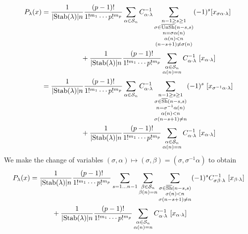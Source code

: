 \documentclass[12pt]{article}
\begin{document}
\begin{align}
P_{\lambda}(x)&= \frac{1}{|{\rm Stab}(\lambda)|n}\frac{(p-1)!}{1!^{m_1}\cdots  p!^{m_p}}\sum_{\alpha \in \mathcal{S}_n} C^{-1}_{\alpha \cdot \lambda }\sum_{\substack{n-1 \geq s\geq 1\\  
 \sigma\in\overline{\rm UnSh}(n-s,s)\\ n=\sigma \alpha(n) \\ \alpha(n)<n \\ (n-s+1)\neq \sigma(n)}} (-1)^{s}[x_{\sigma\alpha\cdot \lambda}] \\
 &\hspace{2cm} + \frac{1}{|{\rm Stab}(\lambda)|n}\frac{(p-1)!}{1!^{m_1}\cdots  p!^{m_p}} \sum_{\substack{\alpha \in \mathcal{S}_n \\ \alpha(n)=n}} C^{-1}_{\alpha\cdot\lambda} \,\,[x_{\alpha\cdot\lambda}]\\
 &= \frac{1}{|{\rm Stab}(\lambda)|n}\frac{(p-1)!}{1!^{m_1}\cdots  p!^{m_p}}\sum_{\alpha \in \mathcal{S}_n} C^{-1}_{\alpha \cdot \lambda }\sum_{\substack{n-1 \geq s\geq 1\\  
 \sigma\in\overline{\rm Sh}(n-s,s)\\ n=\sigma^{-1} \alpha(n)  \\ \alpha(n)<n \\ \sigma(n-s+1)\neq n}} (-1)^{s}\,\,[x_{\sigma^{-1}\alpha\cdot \lambda}] \\
  &\hspace{2cm} + \frac{1}{|{\rm Stab}(\lambda)|n}\frac{(p-1)!}{1!^{m_1}\cdots  p!^{m_p}} \sum_{\substack{\alpha \in \mathcal{S}_n \\ \alpha(n)=n}} C^{-1}_{\alpha\cdot\lambda} \,\,[x_{\alpha\cdot\lambda}]
  \end{align}
  We make the change of variables $(\sigma,\alpha) \mapsto (\sigma,\beta) = (\sigma, \sigma^{-1}\alpha)$ to obtain
  \begin{align}
  &P_{\lambda}(x)= \frac{1}{|{\rm Stab}(\lambda)|n}\frac{(p-1)!}{1!^{m_1}\cdots  p!^{m_p}}\sum_{s=1\ldots n-1}\sum_{\substack{\beta\in \mathcal{S}_n \\ \beta(n)=n}}\sum_{\substack{\sigma \in \overline{{\rm Sh}}(n-s,s)  \\ \sigma(n)<n \\ \sigma(n-s+1)\neq n}} (-1)^s C^{-1}_{ \sigma\beta \cdot \lambda } \,\, [x_{\beta\cdot \lambda}] \\
  &\hspace{2cm} + \frac{1}{|{\rm Stab}(\lambda)|n}\frac{(p-1)!}{1!^{m_1}\cdots  p!^{m_p}} \sum_{\substack{\alpha \in \mathcal{S}_n \\ \alpha(n)=n }} C^{-1}_{\alpha\cdot\lambda} \,\,[x_{\alpha\cdot\lambda}]
\end{align}
\end{document}
